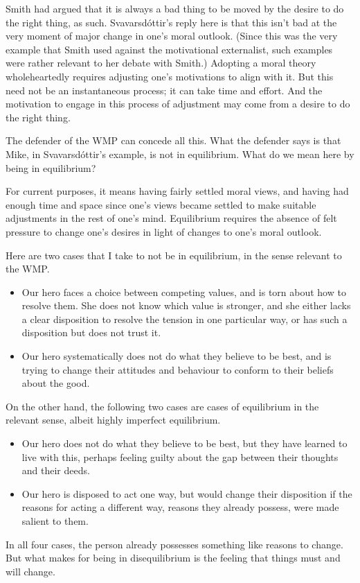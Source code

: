 Smith had argued that it is always a bad thing to be moved by the desire to do the right thing, as such. Svavarsdóttir's reply here is that this isn't bad at the very moment of major change in one's moral outlook. (Since this was the very example that Smith used against the motivational externalist, such examples were rather relevant to her debate with Smith.) Adopting a moral theory wholeheartedly requires adjusting one's motivations to align with it. But this need not be an instantaneous process; it can take time and effort. And the motivation to engage in this process of adjustment may come from a desire to do the right thing.

The defender of the WMP can concede all this. What the defender says is that \gls{Mike}, in Svavarsdóttir's example, is not in equilibrium. What do we mean here by being in equilibrium?

For current purposes, it means having fairly settled moral views, and having had enough time and space since one's views became settled to make suitable adjustments in the rest of one's mind. Equilibrium requires the absence of felt pressure to change one's desires in light of changes to one's moral outlook.

Here are two cases that I take to not be in equilibrium, in the sense relevant to the WMP.

\begin{itemize}
\item{} Our hero faces a choice between competing values, and is torn about how to resolve them. She does not know which value is stronger, and she either lacks a clear disposition to resolve the tension in one particular way, or has such a disposition but does not trust it.

\item{} Our hero systematically does not do what they believe to be best, and is trying to change their attitudes and behaviour to conform to their beliefs about the good.

\end{itemize}
On the other hand, the following two cases are cases of equilibrium in the relevant sense, albeit highly imperfect equilibrium.

\begin{itemize}
\item{} Our hero does not do what they believe to be best, but they have learned to live with this, perhaps feeling guilty about the gap between their thoughts and their deeds.

\item{} Our hero is disposed to act one way, but would change their disposition if the reasons for acting a different way, reasons they already possess, were made salient to them.

\end{itemize}
In all four cases, the person already possesses something like reasons to change. But what makes for being in disequilibrium is the feeling that things must and will change.

